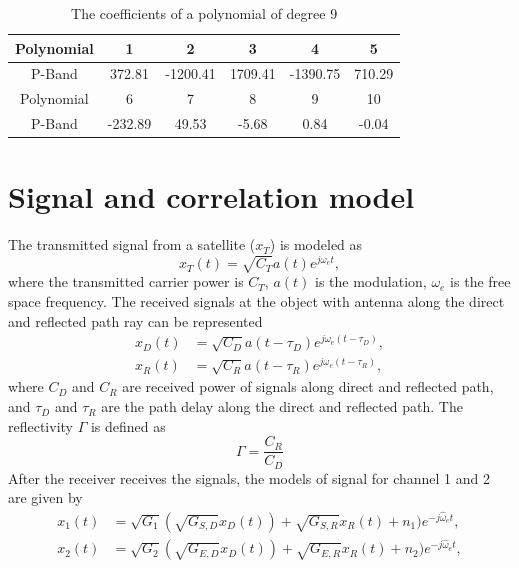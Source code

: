 \documentclass[draftcls,onecolumn]{IEEEtran}  %
\begin{document}
\begin{table}[ht]
\centering
\begin{tabular}  {|c|c|c|c|c|c|}
	\hline
     Polynomial &1&2 &3&4&5\\
    \hline
   P-Band & 372.81 & -1200.41 &	1709.41 & -1390.75 & 710.29\\
     \hline
     Polynomial &6&7&8&9 &10\\
    \hline
   P-Band & -232.89 &	49.53 &	-5.68 & 0.84 & -0.04 \\
    \hline
\end{tabular}
\caption{The coefficients of a polynomial of degree 9}
\label{Table:Polynomial_fitting}
\end{table}

\section{Signal and correlation model}
The transmitted signal from a satellite ($x_{T}$) is modeled as
\begin{equation}
	x_T(t)=\sqrt{C_T}a(t)e^{j\omega_et},
    \label{Eq: xT}
\end{equation}
where the transmitted carrier power is $C_{T}$, $a(t)$ is the modulation, $ω_{e}$ is the free space frequency. The received signals at the object with antenna along the direct and reflected path ray can be represented \begin{equation}
	\begin{split}
  	x_D(t)&=\sqrt{C_D}a(t-\tau_D)e^{j\omega_e(t-\tau_D)}, \\
    x_R(t)&=\sqrt{C_R}a(t-\tau_R)e^{j\omega_e(t-\tau_R)}, 
    \end{split}
    \label{Eq: xD_xR}
\end{equation}
where $C_D$ and $C_R$ are received power of signals along direct and reflected path, and $\tau_D$ and $\tau_R$ are the path delay along the direct and reflected path. The reflectivity $\Gamma$ is defined as
\begin{equation}
	\Gamma=\frac{C_R}{C_D}
    \label{Eq: reflect}
\end{equation}
 After the receiver receives the signals, the models of signal for channel 1 and 2 are given by
 \begin{equation}
  \begin{split}
  	x_1(t)&=\sqrt{G_1}(\sqrt{G_{S,D}} x_D(t)) + \sqrt{G_{S,R}} x_R(t) + n_1)e^{-j\hat{\omega}_et},\\
    x_2(t)&=\sqrt{G_2}(\sqrt{G_{E,D}} x_D(t)) + \sqrt{G_{E,R}} x_R(t) + n_2)e^{-j\hat{\omega}_et},
  \end{split}
  \label{Eq: x1_x2_model}
\end{equation}
\end{document}
